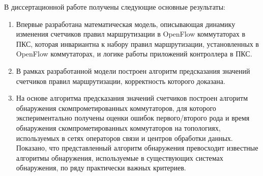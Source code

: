 \documentclass[../thesis.tex]{subfiles}
\begin{document}
\conclusion \label{chapter:conclusion}

В диссертационной работе получены следующие основные результаты:

\begin{enumerate}
\item Впервые разработана математическая модель, описывающая динамику изменения счетчиков правил маршрутизации в OpenFlow коммутаторах в ПКС, которая инвариантна к набору правил маршрутизации, установленных в OpenFlow коммутаторах, и логике работы приложений контроллера в ПКС.

\item В рамках разработанной модели построен алгоритм предсказания значений счетчиков правил маршрутизации, корректность которого доказана.

\item На основе алгоритма предсказания значений счетчиков построен алгоритм обнаружения скомпрометированных коммутаторов, для которого экспериментально получены оценки ошибок первого/второго рода и время обнаружения скомпрометированных коммутаторов на топологиях, используемых в сетях операторов связи и центров обработки данных.
Показано, что представленный алгоритм обнаружения превосходит известные алгоритмы обнаружения, используемые в существующих системах обнаружения, по ряду практически важных критериев.
\end{enumerate}
\end{document}
